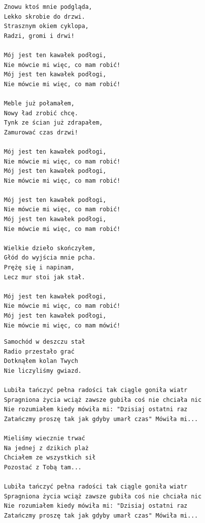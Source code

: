 \documentclass[12pt]{article}
\begin{document}
\begin{verbatim}
Znowu ktoś mnie podgląda,
Lekko skrobie do drzwi.
Strasznym okiem cyklopa,
Radzi, gromi i drwi!

Mój jest ten kawałek podłogi,
Nie mówcie mi więc, co mam robić!
Mój jest ten kawałek podłogi,
Nie mówcie mi więc, co mam robić!

Meble już połamałem,
Nowy ład zrobić chcę.
Tynk ze ścian już zdrapałem,
Zamurować czas drzwi!

Mój jest ten kawałek podłogi,
Nie mówcie mi więc, co mam robić!
Mój jest ten kawałek podłogi,
Nie mówcie mi więc, co mam robić!

Mój jest ten kawałek podłogi,
Nie mówcie mi więc, co mam robić!
Mój jest ten kawałek podłogi,
Nie mówcie mi więc, co mam robić!

Wielkie dzieło skończyłem,
Głód do wyjścia mnie pcha.
Prężę się i napinam,
Lecz mur stoi jak stał.

Mój jest ten kawałek podłogi,
Nie mówcie mi więc, co mam robić!
Mój jest ten kawałek podłogi,
Nie mówcie mi więc, co mam mówić!
\end{verbatim}
\clearpage

\begin{verbatim}
Samochód w deszczu stał
Radio przestało grać
Dotknąłem kolan Twych
Nie liczyliśmy gwiazd.

Lubiła tańczyć pełna radości tak ciągle goniła wiatr
Spragniona życia wciąż zawsze gubiła coś nie chciała nic
Nie rozumiałem kiedy mówiła mi: "Dzisiaj ostatni raz
Zatańczmy proszę tak jak gdyby umarł czas" Mówiła mi...

Mieliśmy wiecznie trwać
Na jednej z dzikich plaż
Chciałem ze wszystkich sił
Pozostać z Tobą tam...

Lubiła tańczyć pełna radości tak ciągle goniła wiatr
Spragniona życia wciąż zawsze gubiła coś nie chciała nic
Nie rozumiałem kiedy mówiła mi: "Dzisiaj ostatni raz
Zatańczmy proszę tak jak gdyby umarł czas" Mówiła mi...
\end{verbatim}
\clearpage
\end{document}
